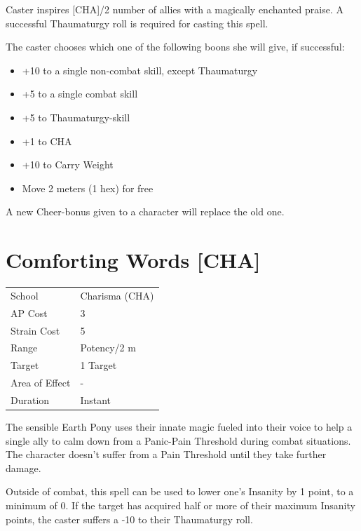 \documentclass[11pt,a4paper,twocolumn]{book}
\begin{document}
\medskip

Caster inspires [CHA]/2 number of allies with a magically enchanted praise. A successful Thaumaturgy roll is required for casting this spell.

The caster chooses which one of the following boons she will give, if successful:
\begin{itemize}
  \item +10 to a single non-combat skill, except Thaumaturgy
  \item +5 to a single combat skill
  \item +5 to Thaumaturgy-skill
  \item +1 to CHA
  \item +10 to Carry Weight
  \item Move 2 meters (1 hex) for free
\end{itemize}

A new Cheer-bonus given to a character will replace the old one.

\vfill


\section*{Comforting Words [CHA]}
{
	\begin{tabu} to 75mm{| X[l,4] | X[l,7] |}
		\hline
		School 			& Charisma (CHA) 	\\
        AP Cost	      	& 3 				\\
        Strain Cost     & 5 				\\
        Range     		& Potency/2 m 		\\
        Target      	& 1 Target 			\\
        Area of Effect  & - 	 			\\
        Duration     	& Instant		 	\\ \hline
	\end{tabu}
		
}

\medskip

The sensible Earth Pony uses their innate magic fueled into their voice to help a single ally to calm down from a Panic-Pain Threshold during combat situations. The character doesn't suffer from a Pain Threshold until they take further damage.

Outside of combat, this spell can be used to lower one's Insanity by 1 point, to a minimum of 0. If the target has acquired half or more of their maximum Insanity points, the caster suffers a -10 to their Thaumaturgy roll.
\end{document}
